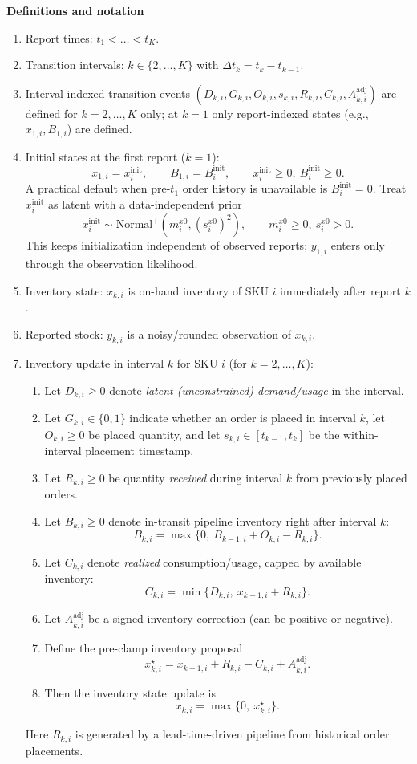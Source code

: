 \documentclass[11pt]{article}
\begin{document}
\textbf{Definitions and notation}
\begin{enumerate}
  \item Report times: $t_1 < \dots < t_K$.
  \item Transition intervals: $k\in\{2,\dots,K\}$ with $\Delta t_k = t_k - t_{k-1}$.
  \item Interval-indexed transition events $(D_{k,i},G_{k,i},O_{k,i},s_{k,i},R_{k,i},C_{k,i},A^{\mathrm{adj}}_{k,i})$ are defined for $k=2,\dots,K$ only; at $k=1$ only report-indexed states (e.g., $x_{1,i},B_{1,i}$) are defined.
  \item Initial states at the first report ($k=1$):
  \[
    x_{1,i}=x^{\mathrm{init}}_i,\qquad B_{1,i}=B^{\mathrm{init}}_i,\qquad x^{\mathrm{init}}_i\ge 0,\ B^{\mathrm{init}}_i\ge 0.
  \]
  A practical default when pre-$t_1$ order history is unavailable is $B^{\mathrm{init}}_i=0$.
  Treat $x^{\mathrm{init}}_i$ as latent with a data-independent prior
  \[
    x^{\mathrm{init}}_i\sim \text{Normal}^+(m^{x0}_i,(s^{x0}_i)^2),\qquad m^{x0}_i\ge 0,\ s^{x0}_i>0.
  \]
  This keeps initialization independent of observed reports; $y_{1,i}$ enters only through the observation likelihood.
  \item Inventory state: $x_{k,i}$ is on-hand inventory of SKU $i$ immediately after report $k$.
  \item Reported stock: $y_{k,i}$ is a noisy/rounded observation of $x_{k,i}$.
  \item Inventory update in interval $k$ for SKU $i$ (for $k=2,\dots,K$):
  \begin{enumerate}
    \item Let $D_{k,i}\ge 0$ denote \emph{latent (unconstrained) demand/usage} in the interval.
    \item Let $G_{k,i}\in\{0,1\}$ indicate whether an order is placed in interval $k$, let $O_{k,i}\ge0$ be placed quantity, and let $s_{k,i}\in[t_{k-1},t_k]$ be the within-interval placement timestamp.
    \item Let $R_{k,i}\ge0$ be quantity \emph{received} during interval $k$ from previously placed orders.
    \item Let $B_{k,i}\ge0$ denote in-transit pipeline inventory right after interval $k$:
    \[
      B_{k,i}=\max\bigl\{0,\ B_{k-1,i}+O_{k,i}-R_{k,i}\bigr\}.
    \]
    \item Let $C_{k,i}$ denote \emph{realized} consumption/usage, capped by available inventory:
    \[
      C_{k,i} = \min\bigl\{D_{k,i},\ x_{k-1,i} + R_{k,i}\bigr\}.
    \]
    \item Let $A^{\mathrm{adj}}_{k,i}$ be a signed inventory correction (can be positive or negative).
    \item Define the pre-clamp inventory proposal
    \[
      x^\star_{k,i} = x_{k-1,i} + R_{k,i} - C_{k,i} + A^{\mathrm{adj}}_{k,i}.
    \]
    \item Then the inventory state update is
    \[
      x_{k,i} = \max\bigl\{0,\ x^\star_{k,i}\bigr\}.
    \]
  \end{enumerate}
  Here $R_{k,i}$ is generated by a lead-time-driven pipeline from historical order placements.


\end{enumerate}
\end{document}
